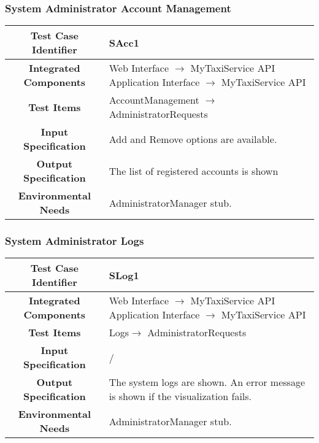 \documentclass[11pt, a4paper,titlepage]{article}
\begin{document}
	\subsubsection{System Administrator Account Management}
	\begin{tabularx}{\textwidth}{| c|X|}
		\hline \textbf{Test Case Identifier} & \label{SAcc1}SAcc1 \\
		\hline \textbf{Integrated Components} & Web Interface $\rightarrow $ MyTaxiService API \newline 
		Application Interface $\rightarrow $ MyTaxiService API \\
		\hline \textbf{Test Items} & AccountManagement $\rightarrow $ AdministratorRequests \\
		\hline \textbf{Input Specification} & Add and Remove options are available. \\
		\hline \textbf{Output Specification} & The list of registered accounts is shown \\
		\hline \textbf{Environmental Needs} & AdministratorManager stub. \\
		\hline
	\end{tabularx}
	\newline
	\newline
	\subsubsection{System Administrator Logs}
	\begin{tabularx}{\textwidth}{| c|X|}
		\hline \textbf{Test Case Identifier} & \label{SLog1}SLog1 \\
		\hline \textbf{Integrated Components} & Web Interface $\rightarrow $ MyTaxiService API \newline 
		Application Interface $\rightarrow $ MyTaxiService API \\
		\hline \textbf{Test Items} & Logs$\rightarrow $ AdministratorRequests  \\
		\hline \textbf{Input Specification} & / \\
		\hline \textbf{Output Specification} & The system logs are shown.\newline
		An error message is shown if the visualization fails. \\
		\hline \textbf{Environmental Needs} & AdministratorManager stub. \\
		\hline
	\end{tabularx}
	\newline
	\newline
\end{document}
